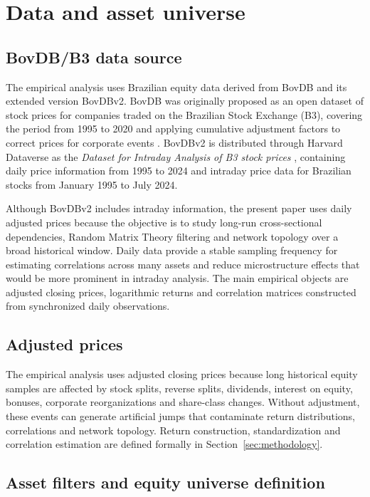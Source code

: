 \section{Data and asset universe}
\label{sec:data}

\subsection{BovDB/B3 data source}

The empirical analysis uses Brazilian equity data derived from BovDB and its extended version BovDBv2. BovDB was originally proposed as an open dataset of stock prices for companies traded on the Brazilian Stock Exchange (B3), covering the period from 1995 to 2020 and applying cumulative adjustment factors to correct prices for corporate events \cite{cardoso_2022_bovdb}. BovDBv2 is distributed through Harvard Dataverse as the \emph{Dataset for Intraday Analysis of B3 stock prices} \cite{souza_2024_bovdbv2}, containing daily price information from 1995 to 2024 and intraday price data for Brazilian stocks from January 1995 to July 2024.

Although BovDBv2 includes intraday information, the present paper uses daily adjusted prices because the objective is to study long-run cross-sectional dependencies, Random Matrix Theory filtering and network topology over a broad historical window. Daily data provide a stable sampling frequency for estimating correlations across many assets and reduce microstructure effects that would be more prominent in intraday analysis. The main empirical objects are adjusted closing prices, logarithmic returns and correlation matrices constructed from synchronized daily observations.

\subsection{Adjusted prices}

The empirical analysis uses adjusted closing prices because long historical equity samples are affected by stock splits, reverse splits, dividends, interest on equity, bonuses, corporate reorganizations and share-class changes. Without adjustment, these events can generate artificial jumps that contaminate return distributions, correlations and network topology. Return construction, standardization and correlation estimation are defined formally in Section~\ref{sec:methodology}.

\subsection{Asset filters and equity universe definition}

